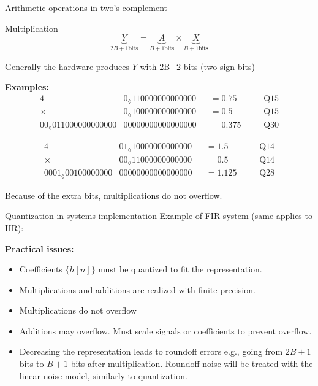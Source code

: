 \documentclass[10pt]{beamer}
\begin{document}
%
\begin{frame}{Arithmetic operations in two's complement}
	\begin{block}{Multiplication}
		\begin{equation*}
		\underbrace{Y}_{2B+1 \text{bits}} = \underbrace{A}_{B+1 \text{bits}}\times \underbrace{X}_{B+1 \text{bits}}
		\end{equation*}
		
		Generally the hardware produces $Y$ with 2B+2 bits (two sign bits)
		
		\textbf{Examples:}
		\begin{alignat*}{4}
		&0_\lozenge110000000000000 &&= 0.75 &&&~\text{Q15} \\
		\times & 0_\lozenge100000000000000 &&= 0.5 &&&~\text{Q15} \\
		\hline
		00_\lozenge 011000000000000&00000000000000000 &&= 0.375 &&&~\text{Q30}
		\end{alignat*}
		
		
		\begin{alignat*}{4}
		&01_\lozenge10000000000000 &&= 1.5 &&&~\text{Q14} \\
		\times & 00_\lozenge11000000000000 &&= 0.5 &&&~\text{Q14} \\
		\hline
		0001_\lozenge 00100000000&00000000000000000 &&= 1.125 &&&~\text{Q28}
		\end{alignat*}
		
		Because of the extra bits, multiplications do not overflow.
		
	\end{block}
\end{frame}

\begin{frame}{Quantization in systems implementation}
Example of FIR system (same applies to IIR):
\begin{center}
	\resizebox{\textwidth}{!}{}
\end{center}

\textbf{Practical issues:}
\begin{itemize}
	\item Coefficients $\{h[n]\}$ must be quantized to fit the representation.
	\item Multiplications and additions are realized with finite precision.
	\item Multiplications do not overflow
	\item Additions may overflow. Must scale signals or coefficients to prevent overflow.
	\item Decreasing the representation leads to roundoff errors e.g., going from $2B+1$ bits to $B+1$ bits after multiplication. Roundoff noise will be treated with the linear noise model, similarly to quantization.
\end{itemize}
\end{frame}
\end{document}
